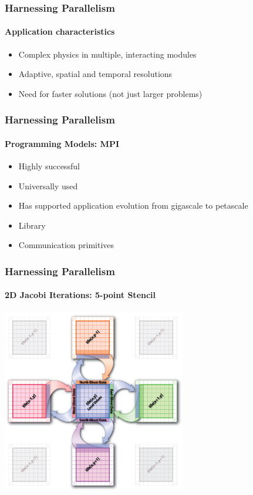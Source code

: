 \begin{frame}[fragile]
\frametitle{Harnessing Parallelism}
\framesubtitle{Application characteristics}
  \begin{itemize}
  \item Complex physics in multiple, interacting modules
  \item Adaptive, spatial and temporal resolutions
  \item Need for faster solutions (not just larger problems)
  \end{itemize}
\end{frame}


\begin{frame}[t]
\frametitle{Harnessing Parallelism}
\framesubtitle{Programming Models: MPI}
  \begin{itemize}
    \item Highly successful
    \item Universally used
    \item Has supported application evolution from gigascale to petascale
  \end{itemize}
  \begin{itemize}
    \item Library
    \item Communication primitives
  \end{itemize}
\end{frame}


\begin{frame}[fragile]
\frametitle{Harnessing Parallelism}
\framesubtitle{2D Jacobi Iterations: 5-point Stencil}
   \begin{center} \includegraphics[width=0.6\textwidth]{figures/2DJacobi_NeighborComm.jpg} \end{center}
\end{frame}


